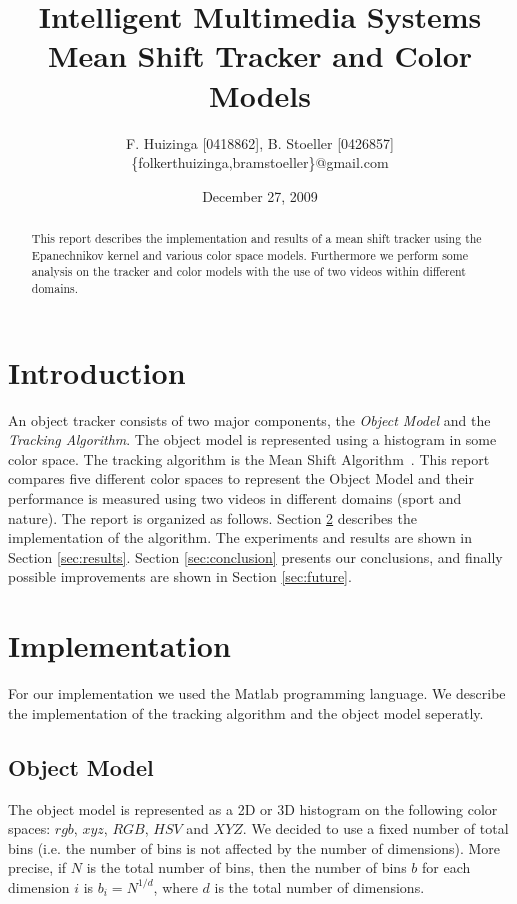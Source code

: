 \documentclass[11pt]{article}
\title{Intelligent Multimedia Systems \\ Mean Shift Tracker and Color Models}
\author{F. Huizinga [0418862], B. Stoeller [0426857] \\
      \{folkerthuizinga,bramstoeller\}@gmail.com}
\date{December 27, 2009}
\begin{document}
\maketitle

\begin{abstract}
This report describes the implementation and results of a mean shift tracker
using the Epanechnikov kernel and various color space models. Furthermore we
perform some analysis on the tracker and color models with the use of two
videos within different domains.
\end{abstract}


\section{Introduction} \label{sec:intro}
An object tracker consists of two major components, the \emph{Object Model} and
the \emph{Tracking Algorithm}. The object model is represented using a
histogram in some color space. The tracking algorithm is the Mean Shift
Algorithm~\cite{kernel-basedobject, real-timetracking}. This report compares
five different color spaces to represent the Object Model and their performance
is measured using two videos in different domains (sport and nature). The
report is organized as follows.  Section \ref{sec:implementation} describes the implementation of the
algorithm. The experiments and results are shown in Section \ref{sec:results}. Section \ref{sec:conclusion}
presents our conclusions, and finally possible improvements are shown in
Section \ref{sec:future}. \newpage


\section{Implementation} \label{sec:implementation}
For our implementation we used the Matlab programming language. We describe the
implementation of the tracking algorithm and the object model seperatly.

\subsection{Object Model} \label{sec:model}
The object model is represented as a 2D or 3D histogram on the following color
spaces: $rgb$, $xyz$, $RGB$, $HSV$ and $XYZ$. We decided to use a fixed number
of total bins (i.e. the number of bins is not affected by the number of
dimensions).  More precise, if $N$ is the total number of bins, then the number
of bins $b$ for each dimension $i$ is $b_i = N^{1/d}$, where $d$ is the total
number of dimensions. 
\end{document}

